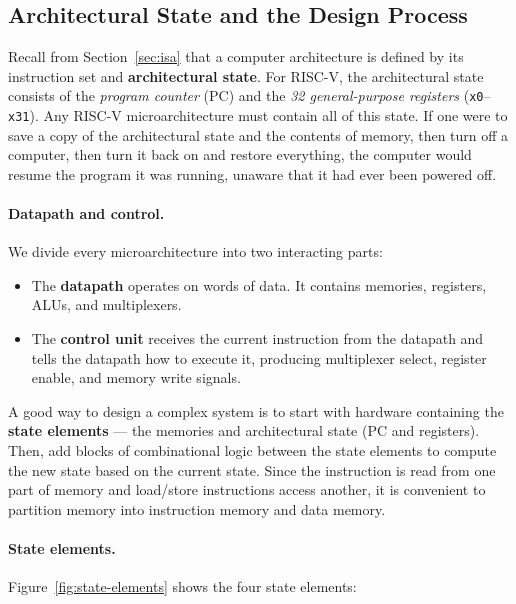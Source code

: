\documentclass[9pt, a4paper]{extarticle}
\begin{document}
\subsection{Architectural State and the Design Process}

Recall from Section~\ref{sec:isa} that a computer architecture is defined by its instruction set and \textbf{architectural state}. For RISC-V, the architectural state consists of the \textit{program counter} (PC) and the \textit{32 general-purpose registers} (\texttt{x0}--\texttt{x31}). Any RISC-V microarchitecture must contain all of this state. If one were to save a copy of the architectural state and the contents of memory, then turn off a computer, then turn it back on and restore everything, the computer would resume the program it was running, unaware that it had ever been powered off.

\paragraph{Datapath and control.} We divide every microarchitecture into two interacting parts:
\begin{itemize}
    \item The \textbf{datapath} operates on words of data. It contains memories, registers, ALUs, and multiplexers.
    \item The \textbf{control unit} receives the current instruction from the datapath and tells the datapath how to execute it, producing multiplexer select, register enable, and memory write signals.
\end{itemize}

A good way to design a complex system is to start with hardware containing the \textbf{state elements} --- the memories and architectural state (PC and registers). Then, add blocks of combinational logic between the state elements to compute the new state based on the current state. Since the instruction is read from one part of memory and load/store instructions access another, it is convenient to partition memory into instruction memory and data memory.

\paragraph{State elements.} Figure~\ref{fig:state-elements} shows the four state elements:
\end{document}
